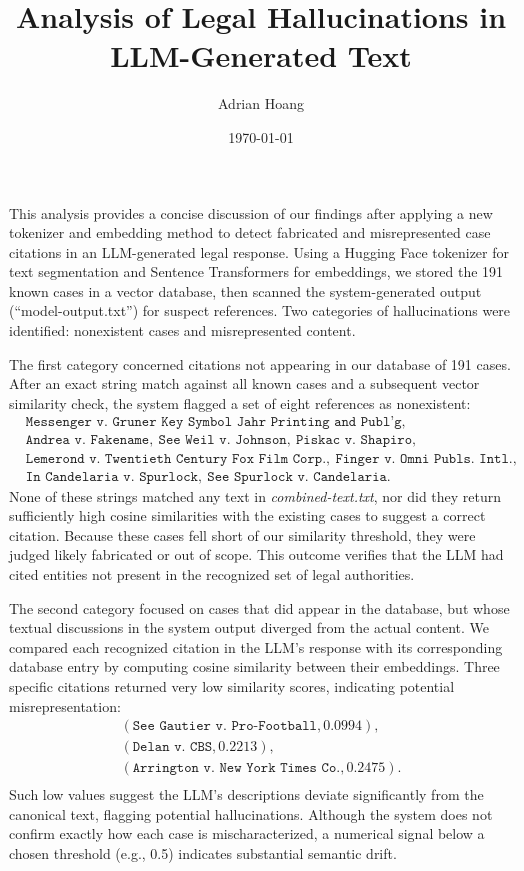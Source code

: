 \documentclass[12pt]{article}
\begin{document}
\title{\textbf{Analysis of Legal Hallucinations in LLM-Generated Text}}
\author{Adrian Hoang}
\date{\today}
\maketitle

This analysis provides a concise discussion of our findings after applying a new tokenizer and embedding method to detect fabricated and misrepresented case citations in an LLM-generated legal response. Using a Hugging Face tokenizer for text segmentation and Sentence Transformers for embeddings, we stored the 191 known cases in a vector database, then scanned the system-generated output (``model-output.txt'') for suspect references. Two categories of hallucinations were identified: nonexistent cases and misrepresented content.

The first category concerned citations not appearing in our database of 191 cases. After an exact string match against all known cases and a subsequent vector similarity check, the system flagged a set of eight references as nonexistent:
\[
\begin{aligned}
&\texttt{Messenger v. Gruner Key Symbol Jahr Printing and Publ’g},\\
&\texttt{Andrea v. Fakename},\ 
\texttt{See Weil v. Johnson},\ 
\texttt{Piskac v. Shapiro},\\
&\texttt{Lemerond v. Twentieth Century Fox Film Corp.},\ 
\texttt{Finger v. Omni Publs. Intl.},\\
&\texttt{In Candelaria v. Spurlock},\ 
\texttt{See Spurlock v. Candelaria}.
\end{aligned}
\]
None of these strings matched any text in \textit{combined-text.txt}, nor did they return sufficiently high cosine similarities with the existing cases to suggest a correct citation. Because these cases fell short of our similarity threshold, they were judged likely fabricated or out of scope. This outcome verifies that the LLM had cited entities not present in the recognized set of legal authorities.

The second category focused on cases that did appear in the database, but whose textual discussions in the system output diverged from the actual content. We compared each recognized citation in the LLM's response with its corresponding database entry by computing cosine similarity between their embeddings. Three specific citations returned very low similarity scores, indicating potential misrepresentation:
\[
\begin{aligned}
(\texttt{See Gautier v. Pro-Football}, 0.0994), \\
(\texttt{Delan v. CBS}, 0.2213), \\
(\texttt{Arrington v. New York Times Co.}, 0.2475). \\
\end{aligned}
\]
Such low values suggest the LLM's descriptions deviate significantly from the canonical text, flagging potential hallucinations. Although the system does not confirm exactly how each case is mischaracterized, a numerical signal below a chosen threshold (e.g., 0.5) indicates substantial semantic drift.
\end{document}
